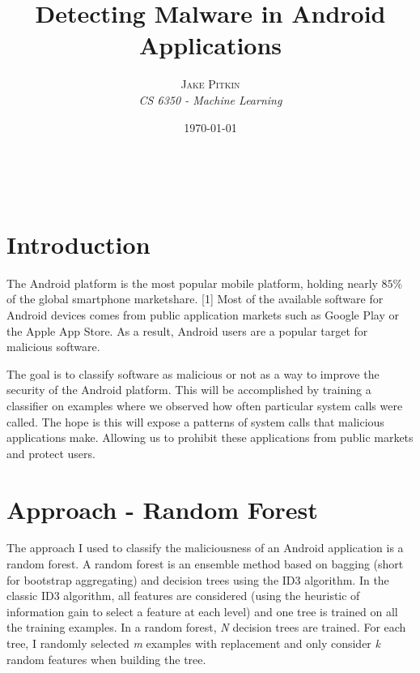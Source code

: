 \documentclass[a4paper, 11pt]{article} %
\title{\textbf{Detecting Malware in Android Applications}\\ %
} %
\author{\textsc{Jake Pitkin} %
\\{\textit{CS 6350 - Machine Learning}}} %
\date{\today} %
\makeatletter
\renewcommand{\maketitle}{ %
\begin{flushright} %
{\LARGE\@title} %

\vspace{50pt} %

{\large\@author} %
\\\@date %

\vspace{40pt} %
\end{flushright}
}
\makeatother
\begin{document}
\maketitle %




\section*{Introduction}

The Android platform is the most popular mobile platform, holding nearly $85\%$ of the global smartphone marketshare. [1] Most of the available software for Android devices comes from public application markets such as Google Play or the Apple App Store. As a result, Android users are a popular target for malicious software. 

The goal is to classify software as malicious or not as a way to improve the security of the Android platform. This will be accomplished by training a classifier on examples where we observed how often particular system calls were called. The hope is this will expose a patterns of system calls that malicious applications make. Allowing us to prohibit these applications from public markets and protect users.
 

\section*{Approach - Random Forest}
The approach I used to classify the maliciousness of an Android application is a random forest. A random forest is an ensemble method based on bagging (short for bootstrap aggregating) and decision trees using the ID3 algorithm. In the classic ID3 algorithm, all features are considered (using the heuristic of information gain to select a feature at each level) and one tree is trained on all the training examples. In a random forest, \textit{N} decision trees are trained. For each tree, I randomly selected \textit{m} examples with replacement and only consider \textit{k} random features when building the tree.
\end{document}
